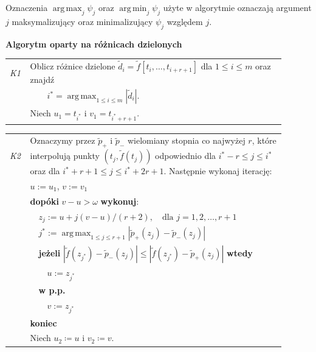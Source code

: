 \documentclass[oik, pdftex, man]{mgrwms}
\DeclareMathOperator*{\argmax}{arg\,max}
\DeclareMathOperator*{\argmin}{arg\,min}
\begin{document}
    Oznaczenia $\argmax_{j} \psi_{j}$ oraz $\argmin_{j} \psi_{j}$ użyte w algorytmie oznaczają argument $j$ maksymalizujący oraz minimalizujący $\psi_{j}$ względem $j$.

    \vspace{10pt}
    \begin{table}[H]
        \begin{center}
            \textbf{Algorytm oparty na różnicach dzielonych}            
        \end{center}

        \begin{tabular}{p{0.045\linewidth} p{0.85\linewidth}}        
            \textit{K1}     & Oblicz różnice dzielone $\tilde{d}_i = \tilde{f}[t_i, \ldots, t_{i+r+1}]$ dla $1 \leq i \leq m $ oraz znajdź \\
                            & \(\displaystyle \qquad i^* = \argmax_{1 \leq i \leq m }|\tilde{d}_i| \).  \\
                            & Niech $u_1 = t_{i^*}$ i $v_1 = t_{i^* + r + 1}$. \\
        \end{tabular}
    \end{table} \vspace{-20pt}
    \begin{table}[H]
        \begin{tabular}{p{0.045\linewidth} p{0.85\linewidth}}
        \textit{K2} & Oznaczymy przez $\tilde{p}_+$ i $\tilde{p}_-$ wielomiany stopnia co najwyżej $r$, które interpolują punkty $(t_j, \tilde{f}(t_j))$ odpowiednio dla $i^* - r \leq j \leq i^*$ oraz dla $i^* + r + 1 \leq j \leq i^* + 2r + 1$. Następnie wykonaj iterację: \\
                        & $u := u_1$, $v := v_1$ \\
                        & \textbf{dopóki} $v-u > \omega$ \textbf{wykonuj}: \\
                        & $\quad$$z_j := u + j(v-u) / (r+2), \quad\text{dla } j = 1, 2, \ldots, r + 1$ \\
                        & $\quad$\(\displaystyle j^* := \argmax_{1 \leq j \leq r + 1}|\tilde{p}_{+}(z_j) - \tilde{p}_{-}(z_j)| \) \\
                        & $\quad$\textbf{jeżeli} $|\tilde{f}(z_{j^*}) - \tilde{p}_{-}(z_j)| \leq |\tilde{f}(z_{j^*}) - \tilde{p}_{+}(z_j)|$ \textbf{wtedy} \\
                        & $\quad\quad$$u:= z_{j^*}$ \\
                        & $\quad$\textbf{w p.p.} \\
                        & $\quad\quad$$v:= z_{j^*}$ \\
                        & \textbf{koniec} \\
                        & Niech $u_2 \coloneqq u$ i $v_2 \coloneqq v$. \\
        \end{tabular}
    \end{table} \vspace{-20pt}
\end{document}
